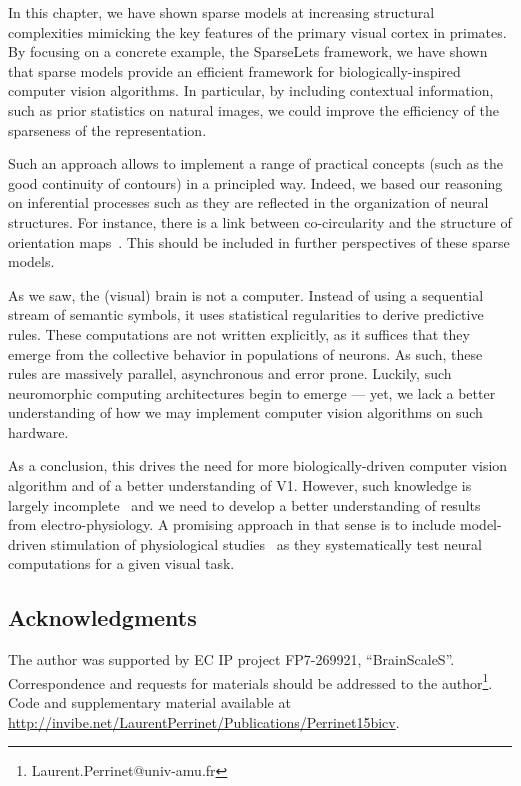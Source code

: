 \documentclass[a4paper, 11pt]{book}
\makeatletter
\newcommand{\Website}{http://invibe.net/LaurentPerrinet}%
\newcommand{\Email}{Laurent.Perrinet@univ-amu.fr}%
\newcommand{\Acknowledgments}{%
The author was supported by EC IP project FP7-269921, ``BrainScaleS''. 
Correspondence and requests for materials should be addressed to the author\footnote{\Email }.
Code and supplementary material available at \url{\Website/Publications/Perrinet15bicv}. %
}%
\makeatother
\begin{document}
In this chapter, we have shown sparse models at increasing structural complexities mimicking the key features of the primary visual cortex in primates.
By focusing on a concrete example, the SparseLets framework, we have shown that sparse models provide 
an efficient framework for biologically-inspired computer vision algorithms.
In particular, by including contextual information, such as prior statistics on natural images, we could improve
the efficiency of the sparseness of the representation.

Such an approach allows to implement a range of practical concepts (such as the good continuity of contours) in a principled way.
Indeed, we based our reasoning on inferential processes such as they are reflected in the organization of neural structures.
For instance, there is a link between co-circularity and the structure of orientation maps~\citep{Hunt09}.
This should be included in further perspectives of these sparse models.

As we saw, the (visual) brain is not a computer.
Instead of using a sequential stream of semantic symbols, it uses statistical regularities to derive predictive rules.
These computations are not written explicitly, as it suffices that they emerge from the collective behavior in populations of neurons.
As such, these rules are massively parallel, asynchronous and error prone.
Luckily, such neuromorphic computing architectures begin to emerge --- yet, we lack a better understanding of how we may implement computer vision algorithms on such hardware.

%
%
As a conclusion, this drives the need for more biologically-driven computer vision algorithm and of a better understanding of V1.
However, such knowledge is largely incomplete~\citep{Olshausen05} and we need to develop a better understanding of results from electro-physiology.
A promising approach in that sense is to include model-driven stimulation of physiological studies~\citep{Leon12,Simoncini12} as they systematically test neural computations for a given visual task.

\subsection*{Acknowledgments} %
\Acknowledgments %
%

\backmatter
\end{document}
